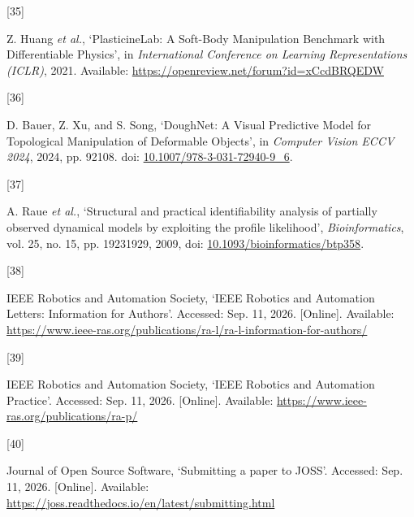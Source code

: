 \documentclass[
  11pt,
]{article}
\newlength{\cslhangindent}
\newlength{\csllabelwidth}
\newenvironment{CSLReferences}[2] %
 {\begin{list}{}{%
  \setlength{\itemindent}{0pt}
  \setlength{\leftmargin}{0pt}
  \setlength{\parsep}{0pt}
  \ifodd #1
   \setlength{\leftmargin}{\cslhangindent}
   \setlength{\itemindent}{-1\cslhangindent}
  \fi
  \setlength{\itemsep}{#2\baselineskip}}}
 {\end{list}}
\newcommand{\CSLLeftMargin}[1]{\parbox[t]{\csllabelwidth}{\strut#1\strut}}
\newcommand{\CSLRightInline}[1]{\parbox[t]{\linewidth - \csllabelwidth}{\strut#1\strut}}
\begin{document}
\begin{CSLReferences}{0}{0}
\CSLLeftMargin{{[}35{]} }%
\CSLRightInline{Z. Huang \emph{et al.}, {`PlasticineLab: A Soft-Body
Manipulation Benchmark with Differentiable Physics'}, in
\emph{International Conference on Learning Representations (ICLR)},
2021. Available: \url{https://openreview.net/forum?id=xCcdBRQEDW}}

\CSLLeftMargin{{[}36{]} }%
\CSLRightInline{D. Bauer, Z. Xu, and S. Song, {`DoughNet: A Visual
Predictive Model for Topological Manipulation of Deformable Objects'},
in \emph{Computer Vision \textendash{}\allowbreak{} ECCV 2024}, 2024,
pp. 92\textendash{}\allowbreak{}108. doi:
\href{https://doi.org/10.1007/978-3-031-72940-9_6}{10.1007/978-3-031-72940-9\_6}.}

\CSLLeftMargin{{[}37{]} }%
\CSLRightInline{A. Raue \emph{et al.}, {`Structural and practical
identifiability analysis of partially observed dynamical models by
exploiting the profile likelihood'}, \emph{Bioinformatics}, vol. 25, no.
15, pp. 1923\textendash{}\allowbreak{}1929, 2009, doi:
\href{https://doi.org/10.1093/bioinformatics/btp358}{10.1093/bioinformatics/btp358}.}

\CSLLeftMargin{{[}38{]} }%
\CSLRightInline{IEEE Robotics and Automation Society, {`IEEE Robotics
and Automation Letters: Information for Authors'}. Accessed: Sep. 11,
2026. {[}Online{]}. Available:
\url{https://www.ieee-ras.org/publications/ra-l/ra-l-information-for-authors/}}

\CSLLeftMargin{{[}39{]} }%
\CSLRightInline{IEEE Robotics and Automation Society, {`IEEE Robotics
and Automation Practice'}. Accessed: Sep. 11, 2026. {[}Online{]}.
Available: \url{https://www.ieee-ras.org/publications/ra-p/}}

\CSLLeftMargin{{[}40{]} }%
\CSLRightInline{Journal of Open Source Software, {`Submitting a paper to
JOSS'}. Accessed: Sep. 11, 2026. {[}Online{]}. Available:
\url{https://joss.readthedocs.io/en/latest/submitting.html}}

\end{CSLReferences}
\end{document}
